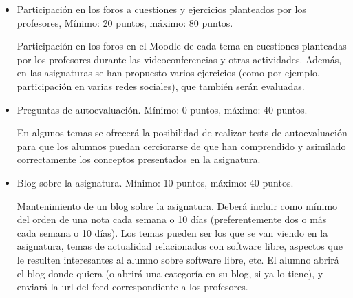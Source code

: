 \documentclass[a4paper,12pt]{article}
\begin{document}
\begin{itemize}
\item Participación en los foros a cuestiones y ejercicios planteados por los profesores,  Mínimo: 20 puntos, máximo: 80 puntos.

Participación en los foros en el Moodle de cada tema en cuestiones planteadas por los profesores durante las videoconferencias y otras actividades. Además, en las asignaturas se han propuesto varios ejercicios (como por ejemplo, participación en varias redes sociales), que también serán evaluadas.

\item Preguntas de autoevaluación. Mínimo: 0 puntos, máximo: 40 puntos.

En algunos temas se ofrecerá la posibilidad de realizar tests de autoevaluación para que los alumnos puedan cerciorarse de que han comprendido y asimilado correctamente los conceptos presentados en la asignatura.

\item Blog sobre la asignatura. Mínimo: 10 puntos, máximo: 40 puntos.

Mantenimiento de un blog sobre la asignatura. Deberá incluir como mínimo del orden de una nota cada semana o 10 días (preferentemente dos o más cada semana o 10 días). Los temas pueden ser los que se van viendo en la asignatura, temas de actualidad relacionados con software libre, aspectos que le resulten interesantes al alumno sobre software libre, etc. El alumno abrirá el blog donde quiera (o abrirá una categoría en su blog, si ya lo tiene), y enviará la url del feed correspondiente a los profesores.






\end{itemize}
\end{document}
